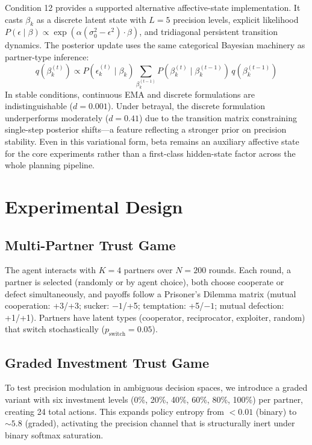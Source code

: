 \documentclass[11pt,a4paper]{article}
\begin{document}
Condition 12 provides a supported alternative affective-state implementation. It casts $\beta_k$ as a discrete latent state with $L = 5$ precision levels, explicit likelihood $P(\epsilon \mid \beta) \propto \exp(\alpha(\sigma_0^2 - \epsilon^2) \cdot \beta)$, and tridiagonal persistent transition dynamics. The posterior update uses the same categorical Bayesian machinery as partner-type inference:
\begin{equation}
  q(\beta_k^{(t)}) \propto P(\epsilon_k^{(t)} \mid \beta_k) \sum_{\beta_k^{(t-1)}} P(\beta_k^{(t)} \mid \beta_k^{(t-1)})\, q(\beta_k^{(t-1)})
\end{equation}
In stable conditions, continuous EMA and discrete formulations are indistinguishable ($d = 0.001$). Under betrayal, the discrete formulation underperforms moderately ($d = 0.41$) due to the transition matrix constraining single-step posterior shifts---a feature reflecting a stronger prior on precision stability. Even in this variational form, beta remains an auxiliary affective state for the core experiments rather than a first-class hidden-state factor across the whole planning pipeline.

\section{Experimental Design}
\label{sec:design}

\subsection{Multi-Partner Trust Game}

The agent interacts with $K = 4$ partners over $N = 200$ rounds. Each round, a partner is selected (randomly or by agent choice), both choose cooperate or defect simultaneously, and payoffs follow a Prisoner's Dilemma matrix (mutual cooperation: +3/+3; sucker: $-1$/+5; temptation: +5/$-1$; mutual defection: +1/+1). Partners have latent types (cooperator, reciprocator, exploiter, random) that switch stochastically ($p_\text{switch} = 0.05$).

\subsection{Graded Investment Trust Game}

To test precision modulation in ambiguous decision spaces, we introduce a graded variant with six investment levels (0\%, 20\%, 40\%, 60\%, 80\%, 100\%) per partner, creating 24 total actions. This expands policy entropy from $< 0.01$ (binary) to $\sim 5.8$ (graded), activating the precision channel that is structurally inert under binary softmax saturation.
\end{document}
